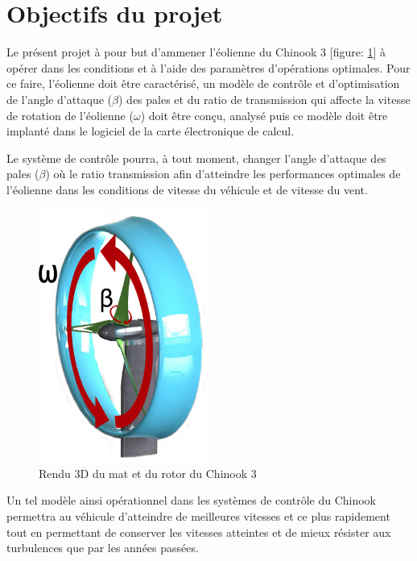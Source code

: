 \documentclass[11pt]{article}
\begin{document}
\section{Objectifs du projet}

Le présent projet à pour but d'ammener l'éolienne du Chinook 3 [figure: \ref{fig:matRotor}] à opérer dans les conditions et à l'aide des paramètres d'opérations optimales. Pour ce faire, l'éolienne doit être caractérisé, un modèle de contrôle et d'optimisation de l'angle d'attaque ($\beta$) des pales et du ratio de transmission qui affecte la vitesse de rotation de l'éolienne ($\omega$) doit être conçu, analysé puis ce modèle doit être implanté dans le logiciel de la carte électronique de calcul.

Le système de contrôle pourra, à tout moment, changer l'angle d'attaque des pales ($\beta$) où le ratio transmission afin d'atteindre les performances optimales de l'éolienne dans les conditions de vitesse du véhicule et de vitesse du vent.


\begin{figure}[H]
  \centering
  \includegraphics[width=0.5\textwidth]{images/matetrotorrotationnel.jpg}
  \caption[Mat et Rotor du Chinook 3]{Rendu 3D du mat et du rotor du Chinook 3}
  \label{fig:matRotor}
\end{figure}

Un tel modèle ainsi opérationnel dans les systèmes de contrôle du Chinook permettra au véhicule d'atteindre de meilleures vitesses et ce plus rapidement tout en permettant de conserver les vitesses atteintes et de mieux résister aux turbulences que par les années passées.
\end{document}
